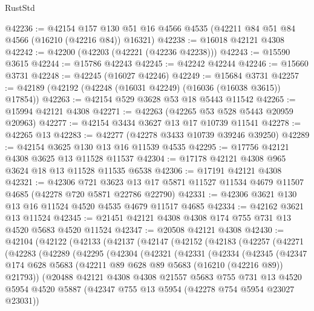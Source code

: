 \begin{lexlean}{RustStd}
\begin{coremodule}
@42236 := @42154
    @157
    @130
    @51
    @16
    @4566
    @4535
    (@42211 @84 @51 @84 @4566 (@16210 (@42216 @84)) @16321)
@42238 := @16018 @42121 @4308
@42242 := @42200 (@42203 (@42221 (@42236 @42238)))
@42243 := @15590 @3615
@42244 := @15786 @42243
@42245 := @42242 @42244
@42246 := @15660 @3731
@42248 := @42245 (@16027 @42246)
@42249 := @15684 @3731
@42257 := @42189 (@42192 (@42248 (@16031 @42249) (@16036 (@16038 @3615)) @17854))
@42263 := @42154 @529 @3628 @53 @18 @5443 @11542
@42265 := @15994 @42121 @4308
@42271 := @42263 (@42265 @53 @528 @5443 @20959 @20963)
@42277 := @42154 @3434 @3627 @13 @17 @10739 @11541
@42278 := @42265 @13
@42283 := @42277 (@42278 @3433 @10739 @39246 @39250)
@42289 := @42154 @3625 @130 @13 @16 @11539 @4535
@42295 := @17756 @42121 @4308 @3625 @13 @11528 @11537
@42304 := @17178 @42121 @4308 @965 @3624 @18 @13 @11528 @11535 @6538
@42306 := @17191 @42121 @4308
@42321 := @42306
    @721
    @3623
    @13
    @17
    @5871
    @11527
    @11534
    @4679
    @11507
    @4685
    (@42278 @720 @5871 @22786 @22790)
@42331 := @42306 @3621 @130 @13 @16 @11524 @4520 @4535 @4679 @11517 @4685
@42334 := @42162 @3621 @13 @11524
@42345 := @21451 @42121 @4308 @4308 @174 @755 @731 @13 @4520 @5683 @4520 @11524
@42347 := @20508 @42121 @4308
@42430 := @42104
    (@42122
      (@42133
        (@42137
          (@42147
            (@42152
              (@42183
                (@42257
                  (@42271
                    (@42283
                      (@42289
                        (@42295
                          (@42304
                            (@42321
                              (@42331
                                (@42334
                                  (@42345
                                    (@42347
                                      @174
                                      @628
                                      @5683
                                      (@42211 @89 @628 @89 @5683 (@16210 (@42216 @89)) @21793))
                                    (@20488
                                      @42121
                                      @4308
                                      @4308
                                      @21557
                                      @5683
                                      @755
                                      @731
                                      @13
                                      @4520
                                      @5954
                                      @4520
                                      @5887
                                      (@42347 @755 @13 @5954 (@42278 @754 @5954 @23027 @23031))

\end{coremodule}
\end{lexlean}

